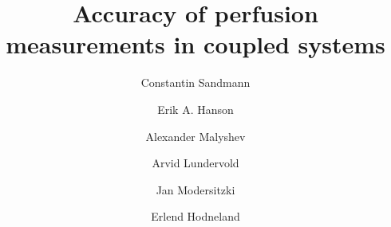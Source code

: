 \documentclass[final,5p,times,twocolumn]{elsarticle}
\begin{document}
\begin{frontmatter}



\title{Accuracy of perfusion measurements in coupled systems}


\author[1]{Constantin Sandmann}
\author[2]{Erik A. Hanson}
\author[2]{Alexander Malyshev}
\author[3,4]{Arvid Lundervold}
\author[1]{Jan Modersitzki}
\author[5,6]{Erlend Hodneland}

\address[1]{Institute of Mathematics and Image Computing, University of L\"ubeck, Germany}
\address[2]{Department of Mathematics, University of Berge, Norway}
\address[3]{Department of Biomedicine, University of Berge, Norway}
\address[4]{Department of Radiology, Haukeland University Hospital, Norway}
\address[5]{Christian Michelsen Research, Bergen, Norway}
\address[6]{MedViz Research Cluster, University of Bergen, Bergen, Norway}






\end{frontmatter}
\end{document}
